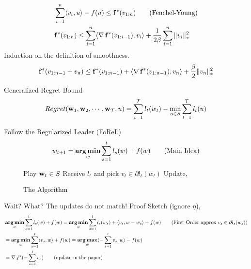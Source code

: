 \begin{frame}
    \begin{align*}
      & \sum_{i=1}^n \langle {v_i} , {u} \rangle - f(u) \le {\operatorname{\mathbf{f}}}^{*}(v_{1:n}) \tag{Fenchel-Young} \\
      & {\operatorname{\mathbf{f}}}^{*}(v_{1:n}) \le \sum_{i=1}^n \langle {\operatorname{\nabla}{\operatorname{\mathbf{f}}}^{*}(v_{1:i-1})} , {v_i} \rangle +\frac{1}{2\beta} \sum_{i=1}^n \|v_i\|_{*}^2
    \end{align*}
    Induction on the definition of smoothness.
    \begin{align*}
      {\operatorname{\mathbf{f}}}^{*}(v_{1:n-1}+v_n) \le {\operatorname{\mathbf{f}}}^{*}(v_{1:n-1}) + \langle {\operatorname{\nabla}{\operatorname{\mathbf{f}}}^{*}(v_{1:n-1})} , {v_n} \rangle +\frac{\beta}{2} \|v_n\|_{*}^2
    \end{align*}

\end{frame}


\begin{frame}{Generalized Regret Bound}
  \begin{align*}
    Regret(\operatorname{\mathbf{w}}_1,\operatorname{\mathbf{w}}_2,\cdots,\operatorname{\mathbf{w}}_{\operatorname{\mathcal{T}}},u) = \sum_{t=1}^{\operatorname{\mathcal{T}}} l_t(w_t) - \min_{u \in S} \sum_{t=1}^{\operatorname{\mathcal{T}}} l_t(u)
  \end{align*}
\end{frame}

\begin{frame}{Follow the Regularized Leader (FoReL)}
  \begin{align*}
    w_{t+1} = \operatorname*{\mathbf{arg\,min}}_w \sum_{s=1}^t l_s(w) + f(w) \tag{Main Idea}
  \end{align*}
  \begin{figure}
  \begin{algorithmic}[1]
    \State Play $\operatorname{\mathbf{w}}_t \in S$
    \State Receive $l_t$ and pick $v_t \in \partial l_t(w_t)$
    \State Update,
    \EndFor
  \end{algorithmic}
  \caption{The Algorithm}
  \end{figure}
\end{frame}

\begin{frame}{Wait? What? The updates do not match!}
  Proof Sketch (ignore $\eta$),
  \begin{align*}
   & \operatorname*{\mathbf{arg\,min}}_w \sum_{s=1}^t l_s(w) + f(w) = \operatorname*{\mathbf{arg\,min}}_w \sum_{s=1}^t l_s(w_s)+\langle {v_s} , {w-w_s} \rangle + f(w) \tag{First Order approx $v_s \in  \partial l_s(w_s)$} \\
    &= \operatorname*{\mathbf{arg\,min}}_w \sum_{s=1}^t \langle {v_s} , {w} \rangle + f(w) = \operatorname*{\mathbf{arg\,max}}_w \langle {-\sum_{s=1}^t v_s} , {w} \rangle -f(w) \\
    &= \operatorname{\nabla} {f}^{*}(-\sum_{s=1}^t v_s) \tag{update in the paper}
  \end{align*}
\end{frame}

